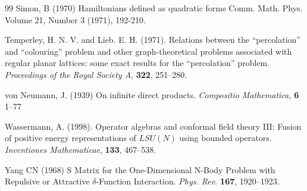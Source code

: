 \documentclass[11pt]{amsart}
\newcommand{\1}{\mathcal I}
\newcommand{\5}{\vskip 5pt}
\begin{document}
\begin{thebibliography}{99}
Simon, B (1970)
Hamiltonians defined as quadratic forms
Comm. Math. Phys.
Volume 21, Number 3 (1971), 192-210.

Temperley, H. N. V. and Lieb. E. H. (1971).
Relations between the ``percolation'' and 
``colouring'' problem and other graph-theoretical
problems associated with regular planar lattices:
some exact results for the ``percolation'' problem.
{\em Proceedings of the Royal Society A},  {\bf 322}, 251--280.


von Neumann, J. (1939)
 On infinite direct products. 
{\em Compositio Mathematica,}
{\bf  6 } 1--77

Wassermann, A. (1998).
Operator algebras and conformal field theory III: Fusion of positive 
energy representations of $LSU(N)$ using bounded operators. 
{\em Inventiones Mathematicae}, {\bf 133}, 467--538.

Yang CN (1968)
 S Matrix for the One-Dimensional N-Body Problem with
 Repulsive or Attractive $\delta$-Function Interaction. 
 {\em Phys. Rev. }{\bf 167}, 1920--1923.
 
\end{thebibliography}
\end{document}
